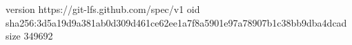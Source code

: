 version https://git-lfs.github.com/spec/v1
oid sha256:3d5a19d9a381ab0d309d461ce62ee1a7f8a5901e97a78907b1c38bb9dba4dcad
size 349692
